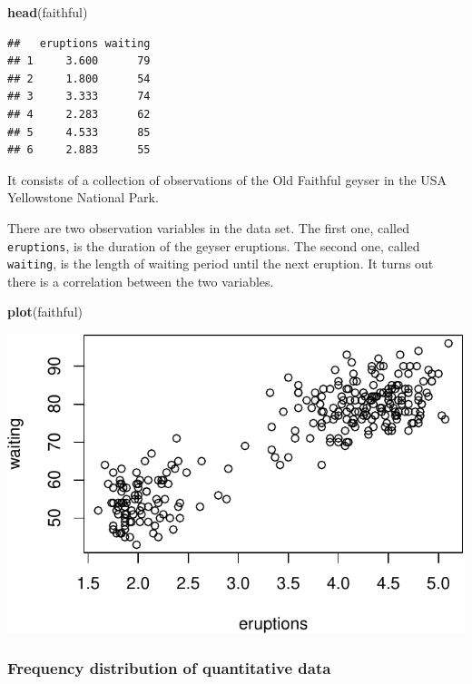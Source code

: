 \documentclass[]{article}
\newenvironment{Shaded}{\begin{snugshade}}{\end{snugshade}}
\newcommand{\KeywordTok}[1]{\textcolor[rgb]{0.13,0.29,0.53}{\textbf{{#1}}}}
\newcommand{\NormalTok}[1]{{#1}}
\numberwithin{equation}{section}
\begin{document}
\begin{Shaded}
\begin{Highlighting}[]
\KeywordTok{head}\NormalTok{(faithful)}
\end{Highlighting}
\end{Shaded}

\begin{verbatim}
##   eruptions waiting
## 1     3.600      79
## 2     1.800      54
## 3     3.333      74
## 4     2.283      62
## 5     4.533      85
## 6     2.883      55
\end{verbatim}

It consists of a collection of observations of the Old Faithful geyser
in the USA Yellowstone National Park.

There are two observation variables in the data set. The first one,
called \texttt{eruptions}, is the duration of the geyser eruptions. The
second one, called \texttt{waiting}, is the length of waiting period
until the next eruption. It turns out there is a correlation between the
two variables.

\begin{Shaded}
\begin{Highlighting}[]
\KeywordTok{plot}\NormalTok{(faithful)}
\end{Highlighting}
\end{Shaded}

\includegraphics{index_files/figure-latex/unnamed-chunk-102-1.pdf}

\subsubsection{Frequency distribution of quantitative
data}\label{frequency-distribution-of-quantitative-data}
\end{document}
